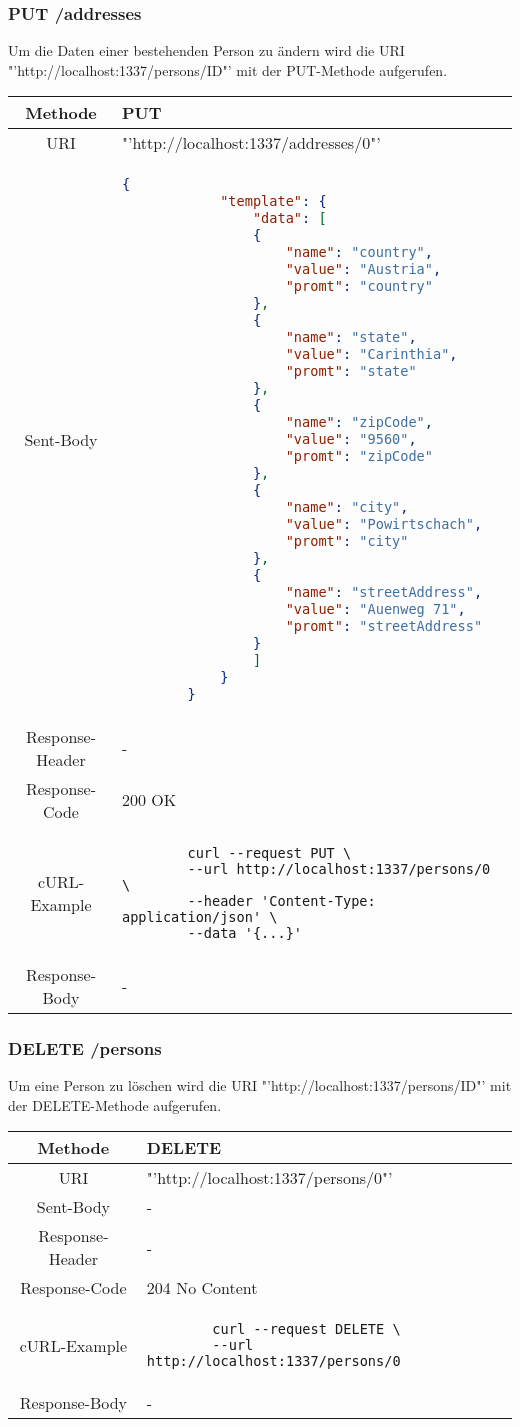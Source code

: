 \documentclass[listof=totoc]{article}
\begin{document}
	\subsubsection{PUT /addresses}
		Um die Daten einer bestehenden Person zu ändern wird die \ac{URI} "'http://localhost:1337/persons/ID"' mit der PUT-Methode aufgerufen.
	\newline
	\begin{longtable}{|c|p{10cm}|}
		\hline 
		Methode & PUT \\ 
		\hline 
		\ac{URI} & "'http://localhost:1337/addresses/0"' \\ 
		\hline 
		Sent-Body & 
		\begin{lstlisting}[language=json]
		{
			"template": {
				"data": [
				{
					"name": "country",
					"value": "Austria",
					"promt": "country"
				},
				{
					"name": "state",
					"value": "Carinthia",
					"promt": "state"
				},
				{
					"name": "zipCode",
					"value": "9560",
					"promt": "zipCode"
				},
				{
					"name": "city",
					"value": "Powirtschach",
					"promt": "city"
				},
				{
					"name": "streetAddress",
					"value": "Auenweg 71",
					"promt": "streetAddress"
				}
				]
			}
		}
		\end{lstlisting} \\ 
		\hline 
		Response-Header & - \\ 
		\hline 
		Response-Code & 200 OK \\ 
		\hline 
		cURL-Example &  
		\begin{verbatim}
		curl --request PUT \
		--url http://localhost:1337/persons/0 \
		--header 'Content-Type: application/json' \
		--data '{...}'
		\end{verbatim}
		\\ 
		\hline 
		Response-Body & - \\ 
		\hline 
	\end{longtable} 
	\newpage
	\subsubsection{DELETE /persons}
	Um eine Person zu löschen wird die \ac{URI} "'http://localhost:1337/persons/ID"' mit der DELETE-Methode aufgerufen.
	\newline
	\begin{longtable}{|c|p{10cm}|}
		\hline 
		Methode & DELETE \\ 
		\hline 
		\ac{URI} & "'http://localhost:1337/persons/0"' \\ 
		\hline 
		Sent-Body & - \\ 
		\hline 
		Response-Header & - \\ 
		\hline 
		Response-Code & 204 No Content \\ 
		\hline 
		cURL-Example &  
		\begin{verbatim}
		curl --request DELETE \
		--url http://localhost:1337/persons/0
		\end{verbatim}
		\\ 
		\hline 
		Response-Body & - \\ 
		\hline 
	\end{longtable} 
\end{document}
